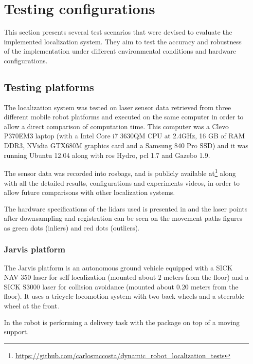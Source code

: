 \section{Testing configurations}\label{sec:testing-configurations}

This section presents several test scenarios that were devised to evaluate the implemented localization system. They aim to test the accuracy and robustness of the implementation under different environmental conditions and hardware configurations.


\subsection{Testing platforms}

The localization system was tested on laser sensor data retrieved from three different mobile robot platforms and executed on the same computer in order to allow a direct comparison of computation time. This computer was a Clevo P370EM3 laptop (with a Intel Core i7 3630QM CPU at 2.4GHz, 16 GB of RAM DDR3, NVidia GTX680M graphics card and a Samsung 840 Pro SSD) and it was running Ubuntu 12.04 along with \gls{ros} Hydro, \gls{pcl} 1.7 and Gazebo 1.9.

The sensor data was recorded into rosbags, and is publicly available at\footnote{\url{https://github.com/carlosmccosta/dynamic_robot_localization_tests}} along with all the detailed results, configurations and experiments videos, in order to allow future comparisons with other localization systems.

The hardware specifications of the \glspl{lidar} used is presented in  and the laser points after downsampling and registration can be seen on the movement paths figures as green dots (inliers) and red dots (outliers).


\subsubsection{Jarvis platform}

The Jarvis platform is an autonomous ground vehicle equipped with a SICK NAV 350 laser for self-localization (mounted about 2 meters from the floor) and a SICK S3000 laser for collision avoidance (mounted about 0.20 meters from the floor). It uses a tricycle locomotion system with two back wheels and a steerable wheel at the front.

In  the robot is performing a delivery task with the package on top of a moving support.


